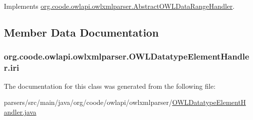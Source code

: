 Implements \hyperlink{classorg_1_1coode_1_1owlapi_1_1owlxmlparser_1_1_abstract_o_w_l_data_range_handler_a5415441dee5284daed2bde817d492017}{org.\-coode.\-owlapi.\-owlxmlparser.\-Abstract\-O\-W\-L\-Data\-Range\-Handler}.



\subsection{Member Data Documentation}
\hypertarget{classorg_1_1coode_1_1owlapi_1_1owlxmlparser_1_1_o_w_l_datatype_element_handler_a593588d31fbc795dffbafb6991e658a0}{
\subsubsection[{iri}]{ org.\-coode.\-owlapi.\-owlxmlparser.\-O\-W\-L\-Datatype\-Element\-Handler.\-iri\hspace{0.3cm}{\ttfamily [private]}}}\label{classorg_1_1coode_1_1owlapi_1_1owlxmlparser_1_1_o_w_l_datatype_element_handler_a593588d31fbc795dffbafb6991e658a0}


The documentation for this class was generated from the following file\-:\begin{DoxyCompactItemize}
\item 
parsers/src/main/java/org/coode/owlapi/owlxmlparser/\hyperlink{_o_w_l_datatype_element_handler_8java}{O\-W\-L\-Datatype\-Element\-Handler.\-java}\end{DoxyCompactItemize}
